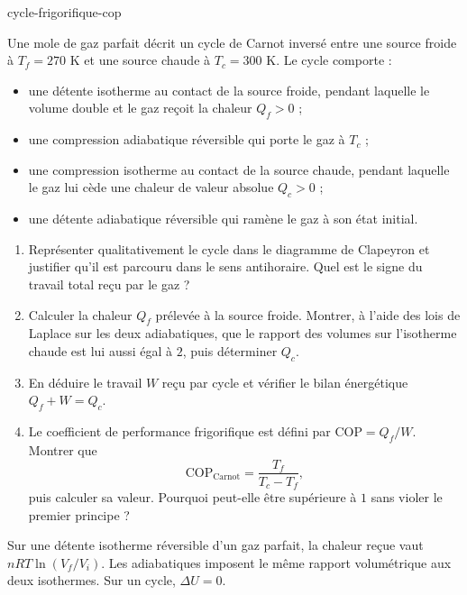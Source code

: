 \begin{exo}{cycle-frigorifique-cop}

Une mole de gaz parfait décrit un cycle de Carnot inversé entre une source froide à $T_f=270$ K et une source chaude à $T_c=300$ K. Le cycle comporte :
\begin{itemize}
\item une détente isotherme au contact de la source froide, pendant laquelle le volume double et le gaz reçoit la chaleur $Q_f>0$ ;
\item une compression adiabatique réversible qui porte le gaz à $T_c$ ;
\item une compression isotherme au contact de la source chaude, pendant laquelle le gaz lui cède une chaleur de valeur absolue $Q_c>0$ ;
\item une détente adiabatique réversible qui ramène le gaz à son état initial.
\end{itemize}

\begin{enumerate}
\item Représenter qualitativement le cycle dans le diagramme de Clapeyron et justifier qu'il est parcouru dans le sens antihoraire. Quel est le signe du travail total reçu par le gaz ?
\item Calculer la chaleur $Q_f$ prélevée à la source froide. Montrer, à l'aide des lois de Laplace sur les deux adiabatiques, que le rapport des volumes sur l'isotherme chaude est lui aussi égal à $2$, puis déterminer $Q_c$.
\item En déduire le travail $W$ reçu par cycle et vérifier le bilan énergétique $Q_f+W=Q_c$.
\item Le coefficient de performance frigorifique est défini par $\mathrm{COP}=Q_f/W$. Montrer que
\[
\mathrm{COP}_{\mathrm{Carnot}}=\frac{T_f}{T_c-T_f},
\]
puis calculer sa valeur. Pourquoi peut-elle être supérieure à $1$ sans violer le premier principe ?
\end{enumerate}

\begin{indication}
Sur une détente isotherme réversible d'un gaz parfait, la chaleur reçue vaut $nRT\ln(V_f/V_i)$. Les adiabatiques imposent le même rapport volumétrique aux deux isothermes. Sur un cycle, $\Delta U=0$.
\end{indication}


\end{exo}
